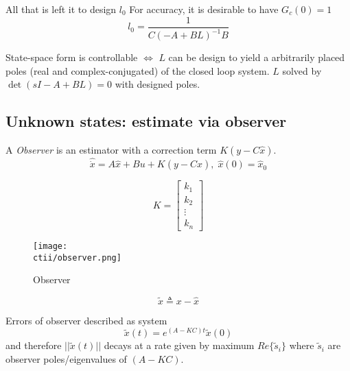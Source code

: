 \begin{multicols}{2}
All that is left it to design $l_0$
For accuracy, it is desirable to have $G_c(0)=1$
\begin{equation*}
    l_0=\frac{1}{C(-A+BL)^{-1}B}
\end{equation*}

State-space form is controllable $\Leftrightarrow$ $L$ can be design to yield a arbitrarily placed poles (real and complex-conjugated) of the closed loop system.
$L$ solved by $\det(sI-A+BL)=0$ with designed poles.





\subsection{Unknown states: estimate via observer}
A \textit{Observer} is an estimator with a correction term $K(y-C\hat{x})$.
\begin{equation*}
    \hat{\dot{x}} = A\hat{x} + Bu + K(y-C\hat{x}), \; \hat{x}(0) = \hat{x}_0
\end{equation*}

\begin{equation*}
    K = \begin{bmatrix} k_1 \\ k_2 \\ \vdots \\ k_n \end{bmatrix}
\end{equation*}

\begin{figure}[H]
    \centering
    \texttt{[image: \\ctii/observer.png]}
    \caption{Observer}
\end{figure}

\begin{equation*}
    \tilde{x} \triangleq x - \hat{x}
\end{equation*}

Errors of observer described as system
\begin{equation*}
    \tilde{x}(t) = e^{(A-KC)t}\tilde{x}(0)
\end{equation*}
and therefore $||\tilde{x}(t)||$ decays at a rate given by maximum $Re\{\tilde{s}_i\}$
where $\tilde{s}_i$ are observer poles/eigenvalues of $(A-KC)$.


\end{multicols}
